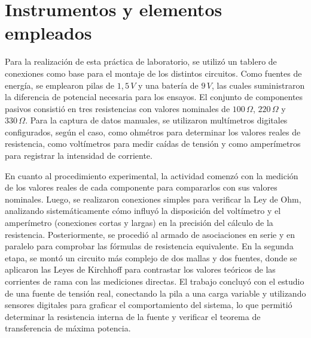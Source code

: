 \section{Instrumentos y elementos empleados}

Para la realizaci\'on de esta pr\'actica de laboratorio, se utiliz\'o un tablero de conexiones como base para el montaje de los distintos circuitos. Como fuentes de energ\'ia, se emplearon pilas de \(1{,}5\,V\) y una bater\'ia de \(9\,V\), las cuales suministraron la diferencia de potencial necesaria para los ensayos. El conjunto de componentes pasivos consisti\'o en tres resistencias con valores nominales de \(100\,\Omega\), \(220\,\Omega\) y \(330\,\Omega\). Para la captura de datos manuales, se utilizaron mult\'imetros digitales configurados, seg\'un el caso, como ohm\'etros para determinar los valores reales de resistencia, como volt\'imetros para medir ca\'idas de tensi\'on y como amper\'imetros para registrar la intensidad de corriente.

En cuanto al procedimiento experimental, la actividad comenz\'o con la medici\'on de los valores reales de cada componente para compararlos con sus valores nominales. Luego, se realizaron conexiones simples para verificar la Ley de Ohm, analizando sistem\'aticamente c\'omo influy\'o la disposici\'on del volt\'imetro y el amper\'imetro (conexiones cortas y largas) en la precisi\'on del c\'alculo de la resistencia. Posteriormente, se procedi\'o al armado de asociaciones en serie y en paralelo para comprobar las f\'ormulas de resistencia equivalente. En la segunda etapa, se mont\'o un circuito m\'as complejo de dos mallas y dos fuentes, donde se aplicaron las Leyes de Kirchhoff para contrastar los valores te\'oricos de las corrientes de rama con las mediciones directas. El trabajo concluy\'o con el estudio de una fuente de tensi\'on real, conectando la pila a una carga variable y utilizando sensores digitales para graficar el comportamiento del sistema, lo que permiti\'o determinar la resistencia interna de la fuente y verificar el teorema de transferencia de m\'axima potencia.

\newpage